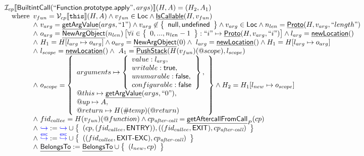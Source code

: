 \documentclass{article}
\makeatletter
\newcommand{\SF}[1]{\mbox{\textsf{#1}}}
\newcommand{\TT}[1]{\mbox{\texttt{#1}}}
\newcommand{\cfgnext}{\hookrightarrow}
\newcommand{\excnext}{\stackrel{\mathsf{exc}}{\hookrightarrow}}
\newcommand{\wherec}[1]{{\rm where}\begin{array}[t]{l}#1\end{array}}
\newcommand{\I}{\mathcal{I}}
\newcommand{\V}{\mathcal{V}}
\newcommand{\set}[1]{\left\{\begin{array}{l}#1\end{array}\right\}}
\newcommand{\lbr}{\llbracket}
\newcommand{\rbr}{\rrbracket}
\newcommand{\hf}[1]{\underline{\sf #1}}
\newcommand{\varloc}[1]{\##1}
\newcommand{\varprop}[1]{@#1}
\def\inblue{\color{blue}}
\def\inblue{\color{blue}}
\makeatother
\begin{document}
\[\begin{array}{l}
\I _{cp}\lbr \SF{BuiltintCall}(``\SF{Function.prototype.apply}",args)\rbr(H,A) = (H_2, A_1)\\
\quad\wherec{
  v_{fun} = \V _{cp}\lbr \TT{this}\rbr (H,A) \land v_{fun} \in \SF{Loc} \land \hf{IsCallable}(H,v_{fun})\\
  \land\ v_{arg} = \hf{getArgValue}(args, ``1") \land v_{arg} \not\in \set{\SF{null},\SF{undefined}}
  \land v_{arg} \in \SF{Loc} \land n_{len} = \hf{Proto}(H,v_{arg},``length")\\
  \land\ o_{arg} = \hf{NewArgObject}(n_{len})\left[ \forall i \in \set{0, ..., n_{len}-1}: 
    ``i" \mapsto \hf{Proto}(H,v_{arg},``i") \right] \land l_{arg} = \hf{newLocation}()\\
  \land\ H_1 = H[l_{arg} \mapsto o_{arg}] \land o_{arg} = \hf{NewArgObject}(0)
  \land\ l_{arg} = \hf{newLocation}() \land H_1 = H[l_{arg} \mapsto o_{arg}]\\
  \land\ l_{scope} = \hf{newLocation}()
  \land\ A_1=\hf{PushStack}(H(v_{fun})(\varprop{scope}),l_{scope}) \\
  \land\ o_{scope} = \set{
    arguments \mapsto \set{value : l_{arg},\\ 
      writable : \SF{true},\\ unumarable : \SF{false},\\ configurable : \SF{false}},\\
    \varprop{this} \mapsto \hf{getArgValue}(args, ``0"),\\
    \varprop{up} \mapsto A,\\
    \varprop{return} \mapsto H(\varloc{temp})(\varprop{return})}
  \land H_2 = H_1[l_{new} \mapsto o_{scope}]\\
  \land\ fid_{callee}= H(v_{fun})(\varprop{function})
  \land cp_{\textit{after-call}} = \hf{getAftercallFromCall}_P(cp) \\
  \land\ {\inblue \cfgnext} :=
  {\inblue \cfgnext}\cup\set{( cp,(fid_{callee},\SF{ENTRY})),
    ((fid_{callee},\SF{EXIT}), cp_{\textit{after-call}})}\\
  \land\ {\inblue \excnext}:={\inblue \excnext}
  \cup\set{((fid_{callee},\SF{EXIT-EXC}), cp_{\textit{after-call}})}\\
  \land\ \hf{BelongsTo}:=\hf{BelongsTo}\cup\set{(l_{new},cp)}
  }\\
\\\\


\end{array}
\]
\end{document}
